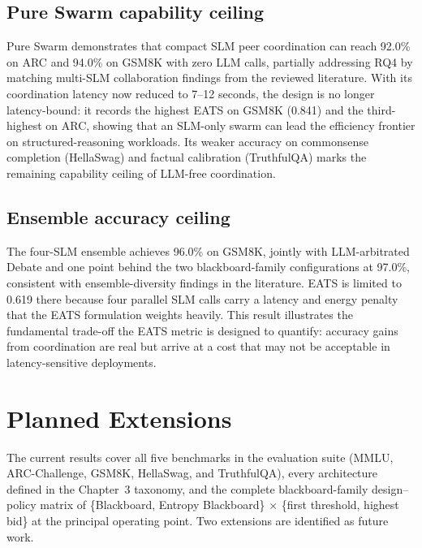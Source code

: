 \subsection{Pure Swarm capability ceiling}
Pure Swarm demonstrates that compact SLM peer coordination can reach 92.0\% on ARC and 94.0\% on GSM8K with zero LLM calls, partially addressing RQ4 by matching multi-SLM collaboration findings from the reviewed literature. With its coordination latency now reduced to 7--12 seconds, the design is no longer latency-bound: it records the highest EATS on GSM8K (0.841) and the third-highest on ARC, showing that an SLM-only swarm can lead the efficiency frontier on structured-reasoning workloads. Its weaker accuracy on commonsense completion (HellaSwag) and factual calibration (TruthfulQA) marks the remaining capability ceiling of LLM-free coordination.

\subsection{Ensemble accuracy ceiling}
The four-SLM ensemble achieves 96.0\% on GSM8K, jointly with LLM-arbitrated Debate and one point behind the two blackboard-family configurations at 97.0\%, consistent with ensemble-diversity findings in the literature. EATS is limited to 0.619 there because four parallel SLM calls carry a latency and energy penalty that the EATS formulation weights heavily. This result illustrates the fundamental trade-off the EATS metric is designed to quantify: accuracy gains from coordination are real but arrive at a cost that may not be acceptable in latency-sensitive deployments.

\section{Planned Extensions}
\label{sec:pending}

The current results cover all five benchmarks in the evaluation suite (MMLU, ARC-Challenge, GSM8K, HellaSwag, and TruthfulQA), every architecture defined in the Chapter~3 taxonomy, and the complete blackboard-family design--policy matrix of \{Blackboard, Entropy Blackboard\} $\times$ \{first threshold, highest bid\} at the principal operating point. Two extensions are identified as future work.

